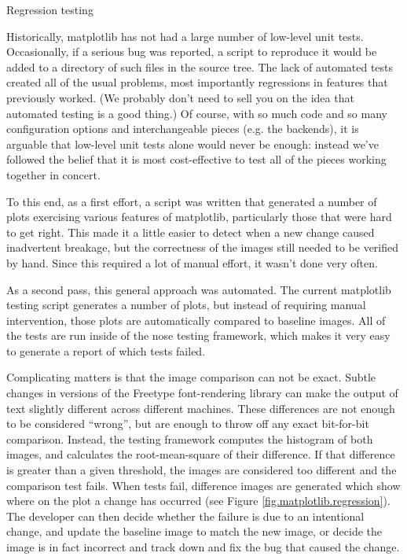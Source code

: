 \begin{aosasect1}{Regression testing}

  Historically, matplotlib has not had a large number of low-level
  unit tests.  Occasionally, if a serious bug was reported, a script
  to reproduce it would be added to a directory of such files in the
  source tree.  The lack of automated tests created all of the usual
  problems, most importantly regressions in features that previously
  worked.  (We probably don't need to sell you on the idea that
  automated testing is a good thing.)  Of course, with so much code
  and so many configuration options and interchangeable pieces
  (e.g. the backends), it is arguable that low-level unit tests alone
  would never be enough: instead we've followed the belief that it is
  most cost-effective to test all of the pieces working together in
  concert.

To this end, as a first effort, a script was written that generated a
number of plots exercising various features of matplotlib,
particularly those that were hard to get right.  This made it a little
easier to detect when a new change caused inadvertent breakage, but
the correctness of the images still needed to be verified by hand.
Since this required a lot of manual effort, it wasn't done very often.

As a second pass, this general approach was automated.  The current
matplotlib testing script generates a number of plots, but instead of
requiring manual intervention, those plots are automatically compared
to baseline images.  All of the tests are run inside of the nose
testing framework, which makes it very easy to generate a report of
which tests failed.

Complicating matters is that the image comparison can not be exact.
Subtle changes in versions of the Freetype font-rendering library can
make the output of text slightly different across different machines.
These differences are not enough to be considered ``wrong'', but are
enough to throw off any exact bit-for-bit comparison.  Instead, the
testing framework computes the histogram of both images, and
calculates the root-mean-square of their difference.  If that
difference is greater than a given threshold, the images are
considered too different and the comparison test fails.  When tests
fail, difference images are generated which show where on the plot a
change has occurred (see Figure \ref{fig.matplotlib.regression}).  The
developer can then decide whether the failure is due to an intentional
change, and update the baseline image to match the new image, or
decide the image is in fact incorrect and track down and fix the bug
that caused the change.


\end{aosasect1}
